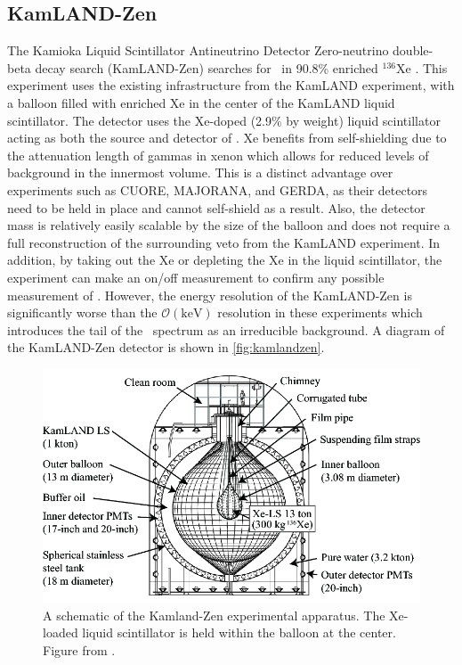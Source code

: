 \subsection{KamLAND-Zen}
The Kamioka Liquid Scintillator Antineutrino Detector Zero-neutrino double-beta decay search (KamLAND-Zen) searches for \zeronubb~in 90.8\% enriched $^{136}$Xe \cite{KamLAND-Zen:2016pfg}.
This experiment uses the existing infrastructure from the KamLAND experiment, with a balloon filled with enriched Xe in the center of the KamLAND liquid scintillator.
The detector uses the Xe-doped (2.9\% by weight) liquid scintillator acting as both the source and detector of \zeronubb.
Xe benefits from self-shielding due to the attenuation length of gammas in xenon which allows for reduced levels of background in the innermost volume.
This is a distinct advantage over experiments such as CUORE, MAJORANA, and GERDA, as their detectors need to be held in place and cannot self-shield as a result.
Also, the detector mass is relatively easily scalable by the size of the balloon and does not require a full reconstruction of the surrounding veto from the KamLAND experiment.
In addition, by taking out the Xe or depleting the Xe in the liquid scintillator, the experiment can make an on/off measurement to confirm any possible measurement of \zeronubb. 
However, the energy resolution of the KamLAND-Zen is significantly worse than the $\mathcal{O}(\textrm{keV})$ resolution in these experiments which introduces the tail of the \twonubb~spectrum as an irreducible background.
A diagram of the KamLAND-Zen detector is shown in \autoref{fig:kamlandzen}.
\begin{figure}[tbph]
\centering
\includegraphics[width=0.7\linewidth]{Figures/KamlandZen}
\caption[A schematic of the Kamland-Zen experimental apparatus]
{A schematic of the Kamland-Zen experimental apparatus.
The Xe-loaded liquid scintillator is held within the balloon at the center.
Figure from \cite{::2015uaa}.}
\label{fig:kamlandzen}
\end{figure}

